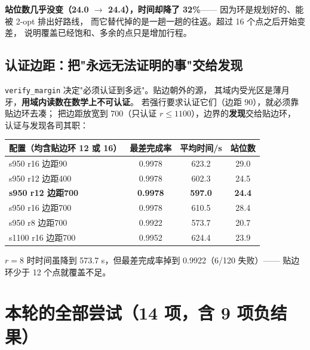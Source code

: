 \textbf{站位数几乎没变（24.0 $\to$ 24.4），时间却降了 32\%}——
因为环是规划好的、能被 2-opt 排出好路线，
而它替代掉的是一趟一趟的往返。超过 16 个点之后开始变差，
说明覆盖已经饱和、多余的点只是增加行程。

\subsection{认证边距：把"永远无法证明的事"交给发现}

\texttt{verify\_margin} 决定"必须认证到多远"。贴边朝外的源，
其域内受光区是薄月牙，\textbf{用域内读数在数学上不可认证}。
若强行要求认证它们（边距 90），就必须靠贴边环去凑；
把边距放宽到 700（只认证 $r\le1100$），边界的\textbf{发现}交给贴边环，
认证与发现各司其职：

\begin{center}
\begin{tabular}{lccc}
\toprule
配置（均含贴边环 12 或 16） & 最差完成率 & 平均时间/s & 站位数 \\ \midrule
s950 r16 边距90 & 0.9978 & 623.2 & 29.0 \\
s950 r12 边距400 & 0.9978 & 602.3 & 24.5 \\
\textbf{s950 r12 边距700} & \textbf{0.9978} & \textbf{597.0} & \textbf{24.4} \\
s950 r16 边距700 & 0.9978 & 610.5 & 28.4 \\
s950 r8 边距700 & 0.9922 & 573.7 & 20.7 \\
s1100 r16 边距700 & 0.9952 & 624.4 & 23.9 \\
\bottomrule
\end{tabular}
\end{center}

$r=8$ 时时间虽降到 573.7 s，但最差完成率掉到 0.9922（6/120 失败）——
贴边环少于 12 个点就覆盖不足。

\section{本轮的全部尝试（14 项，含 9 项负结果）}

